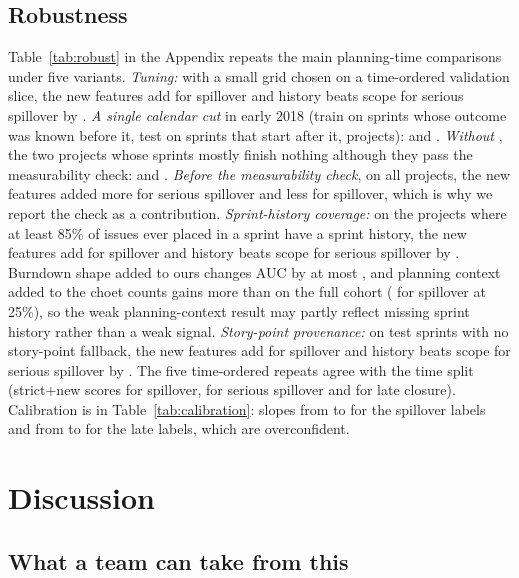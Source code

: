 \documentclass[journal]{IEEEtran}
\begin{document}
\subsection{Robustness}
\label{sec:robust}

Table~\ref{tab:robust} in the Appendix repeats the main planning-time comparisons under five variants. \emph{Tuning:} with a small grid chosen on a time-ordered validation slice, the new features add \dPUNewSp{} \cPUNewSp{} for spillover and history beats scope for serious spillover by \dPUHistSs{} \cPUHistSs. \emph{A single calendar cut} in early 2018 (train on sprints whose outcome was known before it, test on sprints that start after it, \CutProj{} projects): \dPKNewSp{} \cPKNewSp{} and \dPKHistSs{} \cPKHistSs. \emph{Without \RestrictedProj}, the two projects whose sprints mostly finish nothing although they pass the measurability check: \dPRNewSp{} \cPRNewSp{} and \dPRHistSs{} \cPRHistSs. \emph{Before the measurability check}, on all \NProjExport{} projects, the new features added more for serious spillover and less for spillover, which is why we report the check as a contribution. \emph{Sprint-history coverage:} on the \HistProj{} projects where at least 85\% of issues ever placed in a sprint have a sprint history, the new features add \dPHNewSp{} \cPHNewSp{} for spillover and history beats scope for serious spillover by \dPHHistSs{} \cPHHistSs. Burndown shape added to ours changes AUC by at most \HistAddMax, and planning context added to the choet counts gains more than on the full cohort (\dIHCtxSpA{} \cIHCtxSpA{} for spillover at 25\%), so the weak planning-context result may partly reflect missing sprint history rather than a weak signal. \emph{Story-point provenance:} on test sprints with no story-point fallback, the new features add \dPFNewSp{} \cPFNewSp{} for spillover and history beats scope for serious spillover by \dPFHistSs{} \cPFHistSs. The five time-ordered repeats agree with the time split (strict+new scores \repSp{} for spillover, \repSs{} for serious spillover and \repLc{} for late closure). Calibration is in Table~\ref{tab:calibration}: slopes from \SlopeSpMin{} to \SlopeSpMax{} for the spillover labels and from \SlopeLateMin{} to \SlopeLateMax{} for the late labels, which are overconfident.

\section{Discussion}
\label{sec:discussion}

\subsection{What a team can take from this}
\end{document}
